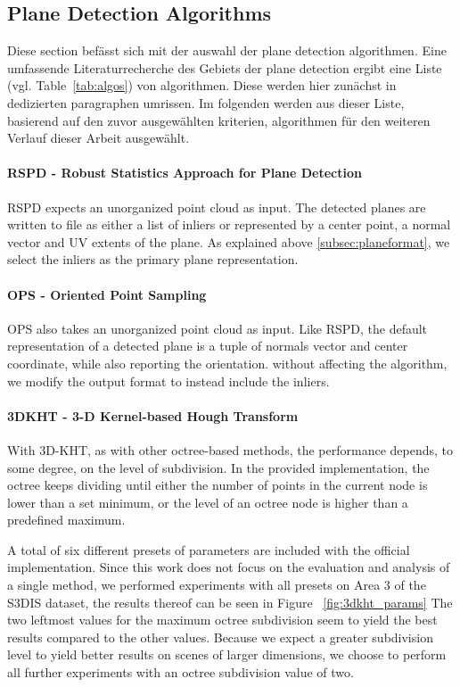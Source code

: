 \documentclass[main.tex]{subfiles}
\begin{document}
\subsection{Plane Detection Algorithms}
Diese section befässt sich mit der auswahl der plane detection algorithmen. Eine umfassende Literaturrecherche des Gebiets der plane detection 
ergibt eine Liste (vgl. Table~\ref{tab:algos}) von algorithmen. Diese werden hier zunächst in dedizierten paragraphen umrissen. 
Im folgenden werden aus dieser Liste, basierend auf den zuvor ausgewählten kriterien, algorithmen für den weiteren Verlauf dieser Arbeit ausgewählt.


\paragraph{RSPD - Robust Statistics Approach for Plane Detection}
RSPD expects an unorganized point cloud as input. The detected planes are written to file as either a list of inliers or
represented by a center point, a normal vector and UV extents of the plane.
As explained above \ref{subsec:planeformat}, we select the inliers as the primary plane representation.

\paragraph{OPS - Oriented Point Sampling}
OPS also takes an unorganized point cloud as input. Like RSPD, the default representation of a detected plane is
a tuple of normals vector and center coordinate, while also reporting the orientation.
without affecting the algorithm, we modify the output format to instead include the inliers.

\paragraph{3DKHT - 3-D Kernel-based Hough Transform}
With 3D-KHT, as with other octree-based methods, the performance depends, to some degree, on the level of subdivision.
In the provided implementation, the octree keeps dividing until either the number of points in the current node is lower than a set minimum, or the
level of an octree node is higher than a predefined maximum.

A total of six different presets of parameters are included with the official implementation.
Since this work does not focus on the evaluation and analysis of a single method, we performed experiments with all presets on Area 3 of the S3DIS\cite{armeni_cvpr16} dataset, the
results thereof can be seen in Figure ~\ref{fig:3dkht_params}
The two leftmost values for the maximum octree subdivision seem to yield the best results compared to the other values.
Because we expect a greater subdivision level to yield better results on scenes of larger dimensions, we choose to perform
all further experiments with an octree subdivision value of two.
\end{document}

